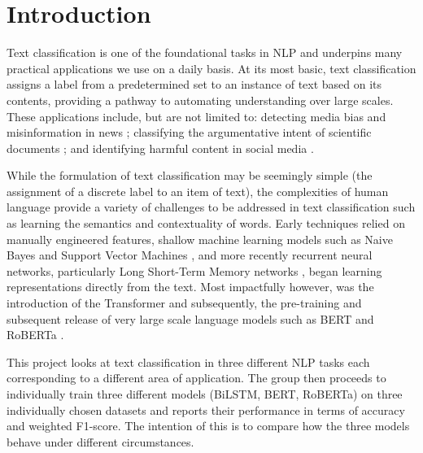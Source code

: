 \documentclass[a4paper,12pt]{report}
\begin{document}
\maketitle

\makeabstract

\maketableofcontents

\setcounter{page}{1}

\section*{Introduction}
Text classification is one of the foundational tasks in NLP and underpins many practical applications we use on a daily basis. At its most basic, text classification assigns a label from a predetermined set to an instance of text based on its contents, providing a pathway to automating understanding over large scales. These applications include, but are not limited to: detecting media bias and misinformation in news \cite{hamborg2019}; classifying the argumentative intent of scientific documents \cite{stab2017}; and identifying harmful content in social media \cite{schmidt2017}.

While the formulation of text classification may be seemingly simple (the assignment of a discrete label to an item of text), the complexities of human language provide a variety of challenges to be addressed in text classification such as learning the semantics and contextuality of words. Early techniques relied on manually engineered features, shallow machine learning models such as Naive Bayes \cite{mccallum1998} and Support Vector Machines \cite{joachims1998}, and more recently recurrent neural networks, particularly Long Short-Term Memory networks \cite{hochreiter1997}, began learning representations directly from the text. Most impactfully however, was the introduction of the Transformer \cite{vaswani2017} and subsequently, the pre-training and subsequent release of very large scale language models such as BERT \cite{devlin2019} and RoBERTa \cite{liu2019}.

This project looks at text classification in three different NLP tasks each corresponding to a different area of application. The group then proceeds to individually train three different models (BiLSTM, BERT, RoBERTa) on three individually chosen datasets and reports their performance in terms of accuracy and weighted F1-score. The intention of this is to compare how the three models behave under different circumstances.
\newpage
\end{document}
